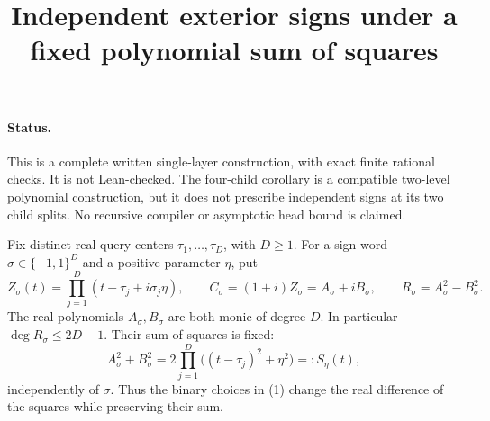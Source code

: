 \documentclass[11pt]{article}
\title{Independent exterior signs under a fixed polynomial sum of squares}
\author{}\date{}
\begin{document}
\maketitle

\paragraph{Status.}
This is a complete written single-layer construction, with exact finite
rational checks. It is not Lean-checked. The four-child corollary is a
compatible two-level polynomial construction, but it does not prescribe
independent signs at its two child splits. No recursive compiler or
asymptotic head bound is claimed.

Fix distinct real query centers $\tau_1,\ldots,\tau_D$, with $D\geq1$.
For a sign word $\sigma\in\{-1,1\}^D$ and a positive parameter $\eta$,
put
\[
 Z_\sigma(t)=\prod_{j=1}^D(t-\tau_j+i\sigma_j\eta),\qquad
 C_\sigma=(1+i)Z_\sigma=A_\sigma+iB_\sigma,
 \qquad R_\sigma=A_\sigma^2-B_\sigma^2.
                                                               \tag{1}
\]
The real polynomials $A_\sigma,B_\sigma$ are both monic of degree $D$.
In particular $\deg R_\sigma\leq2D-1$. Their sum of squares is fixed:
\[
 A_\sigma^2+B_\sigma^2
       =2\prod_{j=1}^D\bigl((t-\tau_j)^2+\eta^2\bigr)
       =:S_\eta(t),                                           \tag{2}
\]
independently of $\sigma$. Thus the binary choices in (1) change the
real difference of the squares while preserving their sum.
\end{document}

